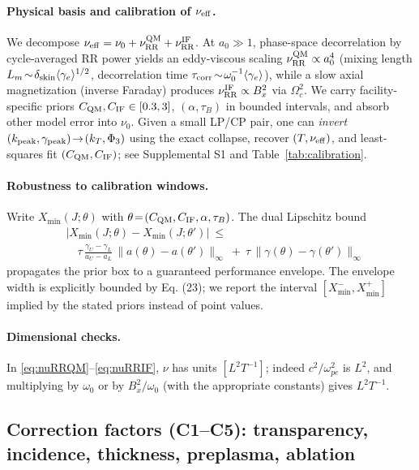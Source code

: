 \documentclass[aps,pre,twocolumn,showpacs,superscriptaddress]{revtex4-2}
\theoremstyle{definition}
\begin{document}
\paragraph*{Physical basis and calibration of $\nu_{\rm eff}$.}
We decompose $\nu_{\rm eff}=\nu_0+\nu_{\rm RR}^{\rm QM}+\nu_{\rm RR}^{\rm IF}$.
At $a_0\gg 1$, phase-space decorrelation by cycle-averaged RR power yields an
eddy-viscous scaling $\nu_{\rm RR}^{\rm QM}\propto a_0^4$ (mixing length $L_m\!\sim\!\delta_{\rm skin}\langle\gamma_e\rangle^{1/2}$,
decorrelation time $\tau_{\rm corr}\!\sim\!\omega_0^{-1}\langle\gamma_e\rangle$), while a slow axial magnetization
(inverse Faraday) produces $\nu_{\rm RR}^{\rm IF}\propto B_x^2$ via $\Omega_c^2$. We carry facility-specific priors
$C_{\rm QM},C_{\rm IF}\in[0.3,3]$, $(\alpha,\tau_B)$ in bounded intervals, and absorb other model error
into $\nu_0$. Given a small LP/CP pair, one can \emph{invert} $(k_{\rm peak},\gamma_{\rm peak})\!\to\!(k_T,\Phi_3)$ using the
exact collapse, recover $(T,\nu_{\rm eff})$, and least-squares fit $(C_{\rm QM},C_{\rm IF})$; see Supplemental S1 and Table~\ref{tab:calibration}.

\paragraph*{Robustness to calibration windows.}
Write $X_{\min}(J;\theta)$ with $\theta\!=\!(C_{\rm QM},C_{\rm IF},\alpha,\tau_B)$. The dual Lipschitz bound
\begin{align}\label{eq:robust-prior}
&|X_{\min}(J;\theta)-X_{\min}(J;\theta')|\ \le\nonumber\\
&\quad \tau\,\frac{\gamma_U-\gamma_L}{a_U-a_L}\,\|a(\theta)-a(\theta')\|_\infty
\ +\ \tau\,\|\gamma(\theta)-\gamma(\theta')\|_\infty
\end{align}
propagates the prior box to a guaranteed performance envelope. The envelope width is explicitly bounded by Eq. (23); we report the interval $[X_{\min}^-, X_{\min}^+]$ implied by the stated priors instead of point values.

\paragraph{Dimensional checks.}
In \eqref{eq:nuRRQM}–\eqref{eq:nuRRIF}, $\nu$ has units $[L^2T^{-1}]$; indeed $c^2/\omega_{pe}^2$ is $L^2$, and multiplying by $\omega_0$ or by $B_x^2/\omega_0$ (with the appropriate constants) gives $L^2T^{-1}$.

\subsection{Correction factors (C1–C5): transparency, incidence, thickness, preplasma, ablation}\label{subsec:corr}
\end{document}
